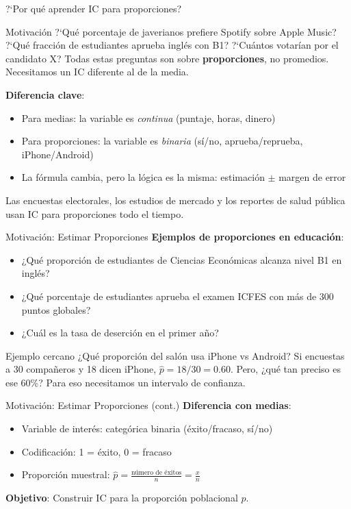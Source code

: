 \documentclass[aspectratio=169, 11pt]{beamer}
\begin{document}
\begin{frame}{?`Por qu\'e aprender IC para proporciones?}
\begin{exampleblock}{Motivaci\'on}
?`Qu\'e porcentaje de javerianos prefiere Spotify sobre Apple Music? ?`Qu\'e fracci\'on de estudiantes aprueba ingl\'es con B1? ?`Cu\'antos votar\'ian por el candidato X? Todas estas preguntas son sobre \textbf{proporciones}, no promedios. Necesitamos un IC diferente al de la media.
\end{exampleblock}

\textbf{Diferencia clave}:
\begin{itemize}\setlength{\itemsep}{1pt}
  \item Para medias: la variable es \emph{continua} (puntaje, horas, dinero)
  \item Para proporciones: la variable es \emph{binaria} (s\'i/no, aprueba/reprueba, iPhone/Android)
  \item La f\'ormula cambia, pero la l\'ogica es la misma: estimaci\'on $\pm$ margen de error
\end{itemize}

\alert{Las encuestas electorales, los estudios de mercado y los reportes de salud p\'ublica usan IC para proporciones todo el tiempo.}
\end{frame}

\begin{frame}{Motivación: Estimar Proporciones}
\textbf{Ejemplos de proporciones en educación}:
\begin{itemize}
  \item ¿Qué proporción de estudiantes de Ciencias Econ\'omicas alcanza nivel B1 en inglés?
  \item ¿Qué porcentaje de estudiantes aprueba el examen ICFES con más de 300 puntos globales?
  \item ¿Cuál es la tasa de deserción en el primer año?
\end{itemize}

\begin{exampleblock}{Ejemplo cercano}
¿Qu\'e proporci\'on del sal\'on usa iPhone vs Android? Si encuestas a 30 compa\~neros y 18 dicen iPhone, $\hat{p} = 18/30 = 0.60$. Pero, ¿qu\'e tan preciso es ese 60\%? Para eso necesitamos un \alert{intervalo de confianza}.
\end{exampleblock}
\end{frame}

\begin{frame}{Motivación: Estimar Proporciones (cont.)}
\textbf{Diferencia con medias}:
\begin{itemize}
  \item Variable de interés: \alert{categórica binaria} (éxito/fracaso, sí/no)
  \item Codificación: 1 = éxito, 0 = fracaso
  \item Proporción muestral: $\hat{p} = \frac{\text{número de éxitos}}{n} = \frac{x}{n}$
\end{itemize}

\vspace{0.3cm}
\textbf{Objetivo}: Construir IC para la proporción poblacional $p$.
\end{frame}
\end{document}
